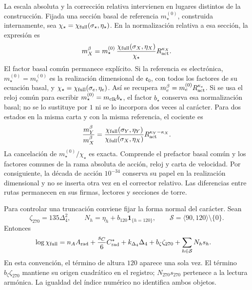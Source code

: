 La escala absoluta y la corrección relativa intervienen en lugares
distintos de la construcción. Fijada una sección basal de referencia
\(m_\star^{(0)}\), construida internamente, sea
\(\chi_\star=\chi_{\rm full}(\sigma_\star,\eta_\star)\).
En la normalización relativa a esa sección, la expresión es
\[
 m_X^\beta=m_\star^{(0)}\,
 \frac{\chi_{\rm full}(\sigma_X,\eta_X)}{\chi_\star}
 R_{\rm act}^{\kappa_X}.
\]
El factor basal común permanece explícito. Si la referencia es electrónica,
\(m_\star^{(0)}=m_e^{(0)}\) es la realización dimensional de
\(\mathfrak e_0\), con todos los factores de su ecuación basal, y
\(\chi_\star=\chi_{\rm full}(\sigma_e,\eta_e)\). Así se recupera
\(m_e^\beta=m_e^{(0)}R_{\rm act}^{\kappa_e}\). Si se usa el reloj
común para escribir \(m_\star^{(0)}=m_{\rm clk}b_\star\), el
factor \(b_\star\) conserva esa normalización basal; no se lo sustituye
por \(1\) ni se lo incorpora dos veces al carácter. Para dos estados
en la misma carta y con la misma referencia, el cociente es
\[
 \frac{m_Y^\beta}{m_X^\beta}
 =\frac{\chi_{\rm full}(\sigma_Y,\eta_Y)}
        {\chi_{\rm full}(\sigma_X,\eta_X)}
     R_{\rm act}^{\kappa_Y-\kappa_X}.
\]
La cancelación de \(m_\star^{(0)}/\chi_\star\) es exacta. Comprende
el prefactor basal común y los factores comunes de la rama absoluta de
acción, reloj y carta de velocidad. Por
consiguiente, la década de acción \(10^{-34}\) conserva su papel en
la realización dimensional y no se inserta otra vez en el corrector
relativo. Las diferencias entre rutas permanecen en sus firmas, lectores
y secciones de torre.

Para controlar una truncación conviene fijar la forma normal del carácter.
Sean
\[
 \zeta_{270}=135\Delta_4^2,\qquad
 N_h=\eta_h+b_{120}\mathbf 1_{\{h=120\}},\qquad
 \mathcal S=\langle90,120\rangle\setminus\{0\}.
\]
Entonces
\[
\begin{split}
 \log\chi_{\rm full}
 ={}&n_AA_{\rm rad}+\frac{s_C}{6}C^*_{\rm rad}
       +k_{\Delta_4}\Delta_4+b_\zeta\zeta_{270}
       +\sum_{h\in\mathcal S}N_hs_h .
\end{split}
\]
En esta convención, el término de altura \(120\) aparece una sola vez.
El término \(b_\zeta\zeta_{270}\) mantiene su origen cuadrático en el
registro; \(N_{270}s_{270}\) pertenece a la lectura armónica. La
igualdad del índice numérico no identifica ambos objetos.

